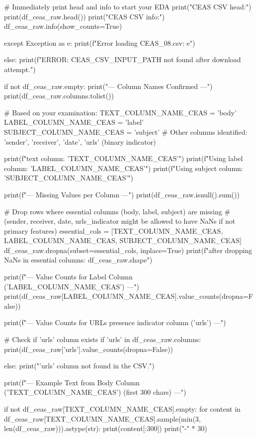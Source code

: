 \begin{ffcode}
        # Immediately print head and info to start your EDA
        print("\nRaw CEAS CSV head:")
        print(df_ceas_raw.head())
        print("\nRaw CEAS CSV info:")
        df_ceas_raw.info(show_counts=True)

    except Exception as e:
        print(f"Error loading CEAS_08.csv: {e}")

else:
    print(f"ERROR: {CEAS_CSV_INPUT_PATH} not found after download attempt.")

if not df_ceas_raw.empty:
    print("--- Column Names Confirmed ---")
    print(df_ceas_raw.columns.tolist())

    # Based on your examination:
    TEXT_COLUMN_NAME_CEAS = 'body'
    LABEL_COLUMN_NAME_CEAS = 'label'
    SUBJECT_COLUMN_NAME_CEAS = 'subject'
    # Other columns identified: 'sender', 'receiver', 'date', 'urls' (binary indicator)

    print(f"\nUsing text column: '{TEXT_COLUMN_NAME_CEAS}'")
    print(f"Using label column: '{LABEL_COLUMN_NAME_CEAS}'")
    print(f"Using subject column: '{SUBJECT_COLUMN_NAME_CEAS}'")

    print(f"\n--- Missing Values per Column ---")
    print(df_ceas_raw.isnull().sum())

    # Drop rows where essential columns (body, label, subject) are missing
    # (sender, receiver, date, urls_indicator might be allowed to have NaNs if not primary features)
    essential_cols = [TEXT_COLUMN_NAME_CEAS, LABEL_COLUMN_NAME_CEAS, SUBJECT_COLUMN_NAME_CEAS]
    df_ceas_raw.dropna(subset=essential_cols, inplace=True)
    print(f"\nShape after dropping NaNs in essential columns: {df_ceas_raw.shape}")


    print(f"\n--- Value Counts for Label Column ('{LABEL_COLUMN_NAME_CEAS}') ---")
    print(df_ceas_raw[LABEL_COLUMN_NAME_CEAS].value_counts(dropna=False))

    print(f"\n--- Value Counts for URLs presence indicator column ('urls') ---")

    # Check if 'urls' column exists
    if 'urls' in df_ceas_raw.columns:
        print(df_ceas_raw['urls'].value_counts(dropna=False))

    else:
        print("'urls' column not found in the CSV.")

    print(f"\n--- Example Text from Body Column ('{TEXT_COLUMN_NAME_CEAS}') (first 300 chars) ---")

    if not df_ceas_raw[TEXT_COLUMN_NAME_CEAS].empty:
        for content in df_ceas_raw[TEXT_COLUMN_NAME_CEAS].sample(min(3, len(df_ceas_raw))).astype(str):
            print(content[:300])
            print("-" * 30)


\end{ffcode}
